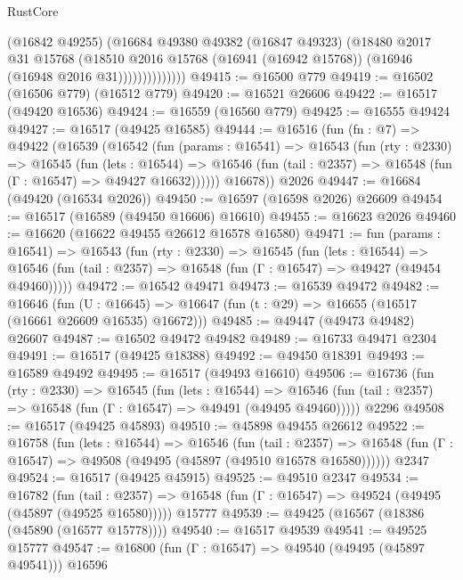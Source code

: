 \begin{lexlean}{RustCore}
\begin{coremodule}
                      (@16842 @49255)
                      (@16684
                        @49380
                        @49382
                        (@16847 @49323)
                        (@18480
                          @2017
                          @31
                          @15768
                          (@18510
                            @2016
                            @15768
                            (@16941 (@16942 @15768))
                            (@16946 (@16948 @2016 @31))))))))))))))
@49415 := @16500 @779
@49419 := @16502 (@16506 @779) (@16512 @779)
@49420 := @16521 @26606
@49422 := @16517 (@49420 @16536)
@49424 := @16559 (@16560 @779)
@49425 := @16555 @49424
@49427 := @16517 (@49425 @16585)
@49444 := @16516
    (fun (fn : @7) =>
    @49422
      (@16539
        (@16542
          (fun (params : @16541) =>
          @16543
            (fun (rty : @2330) =>
            @16545
              (fun (lets : @16544) =>
              @16546 (fun (tail : @2357) => @16548 (fun (Γ : @16547) => @49427 @16632))))))
        @16678))
    @2026
@49447 := @16684 (@49420 (@16534 @2026))
@49450 := @16597 (@16598 @2026) @26609
@49454 := @16517 (@16589 (@49450 @16606) @16610)
@49455 := @16623 @2026
@49460 := @16620 (@16622 @49455 @26612 @16578 @16580)
@49471 := fun (params : @16541) =>
  @16543
    (fun (rty : @2330) =>
    @16545
      (fun (lets : @16544) =>
      @16546 (fun (tail : @2357) => @16548 (fun (Γ : @16547) => @49427 (@49454 @49460)))))
@49472 := @16542 @49471
@49473 := @16539 @49472
@49482 := @16646
    (fun (U : @16645) => @16647 (fun (t : @29) => @16655 (@16517 (@16661 @26609 @16535) @16672)))
@49485 := @49447 (@49473 @49482) @26607
@49487 := @16502 @49472 @49482
@49489 := @16733 @49471 @2304
@49491 := @16517 (@49425 @18388)
@49492 := @49450 @18391
@49493 := @16589 @49492
@49495 := @16517 (@49493 @16610)
@49506 := @16736
    (fun (rty : @2330) =>
    @16545
      (fun (lets : @16544) =>
      @16546 (fun (tail : @2357) => @16548 (fun (Γ : @16547) => @49491 (@49495 @49460)))))
    @2296
@49508 := @16517 (@49425 @45893)
@49510 := @45898 @49455 @26612
@49522 := @16758
    (fun (lets : @16544) =>
    @16546
      (fun (tail : @2357) =>
      @16548 (fun (Γ : @16547) => @49508 (@49495 (@45897 (@49510 @16578 @16580))))))
    @2347
@49524 := @16517 (@49425 @45915)
@49525 := @49510 @2347
@49534 := @16782
    (fun (tail : @2357) => @16548 (fun (Γ : @16547) => @49524 (@49495 (@45897 (@49525 @16580)))))
    @15777
@49539 := @49425 (@16567 (@18386 (@45890 (@16577 @15778))))
@49540 := @16517 @49539
@49541 := @49525 @15777
@49547 := @16800 (fun (Γ : @16547) => @49540 (@49495 (@45897 @49541))) @16596

\end{coremodule}
\end{lexlean}
